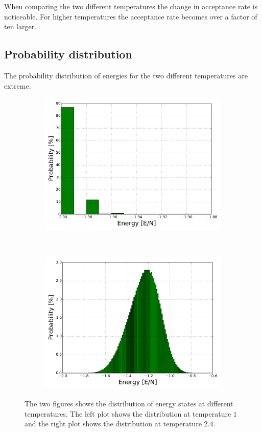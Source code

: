 When comparing the two different temperatures the change in acceptance rate is noticeable. For higher temperatures the acceptance rate becomes over a factor of ten larger. 


\subsection{Probability distribution}

The probability distribution of energies for the two different temperatures are extreme.

\begin{figure}[H]
    \centering
    \begin{subfigure}{0.5\textwidth}
        \centering
        \includegraphics[width=\linewidth]{result/bilder/hist/MC1000000T1-distN20-hist}
        \caption{}
    \end{subfigure}%
    ~ 
    \begin{subfigure}{0.5\textwidth}
        \centering
        \includegraphics[width=\linewidth]{result/bilder/hist/MC1000000T24-distN20-hist}
        \caption{}
    \end{subfigure}
    \caption{The two figures shows the distribution of energy states at different temperatures. The left plot shows the distribution at temperature $1$ and the right plot shows the distribution at temperature $2.4$.}
    \label{fig:tc-chi-cv}
\end{figure}

